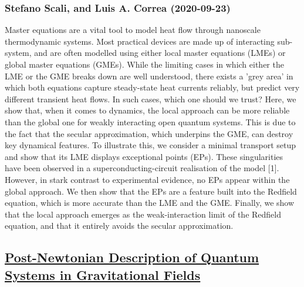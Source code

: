 \subsubsection*{Stefano Scali, and Luis A. Correa (2020-09-23)}
Master equations are a vital tool to model heat flow through nanoscale
thermodynamic systems. Most practical devices are made up of interacting
sub-system, and are often modelled using either local master equations (LMEs)
or global master equations (GMEs). While the limiting cases in which either the
LME or the GME breaks down are well understood, there exists a 'grey area' in
which both equations capture steady-state heat currents reliably, but predict
very different transient heat flows. In such cases, which one should we trust?
Here, we show that, when it comes to dynamics, the local approach can be more
reliable than the global one for weakly interacting open quantum systems. This
is due to the fact that the secular approximation, which underpins the GME, can
destroy key dynamical features. To illustrate this, we consider a minimal
transport setup and show that its LME displays exceptional points (EPs). These
singularities have been observed in a superconducting-circuit realisation of
the model [1]. However, in stark contrast to experimental evidence, no EPs
appear within the global approach. We then show that the EPs are a feature
built into the Redfield equation, which is more accurate than the LME and the
GME. Finally, we show that the local approach emerges as the weak-interaction
limit of the Redfield equation, and that it entirely avoids the secular
approximation.

\subsection*{\href{http://arxiv.org/abs/2009.11319v1}{Post-Newtonian Description of Quantum Systems in Gravitational Fields}}
